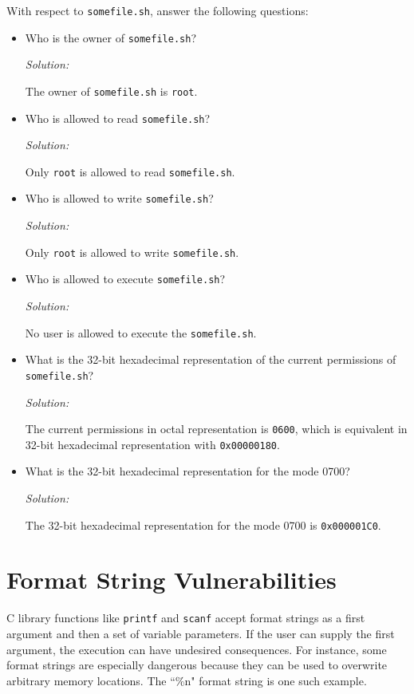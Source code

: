 \documentclass[a4paper,11pt]{article}
\newenvironment{solution}%
{\par{\noindent\small\textit{Solution:}}\vspace{-12pt}\begin{framed}}%
{\end{framed}\par}
\begin{document}
\noindent With respect to \texttt{somefile.sh}, answer the following questions:
\begin{itemize}
\item Who is the owner of \texttt{somefile.sh}?
\ifsolution\begin{solution}
The owner of \texttt{somefile.sh} is \texttt{root}.
\end{solution}\fi

\item Who is allowed to read \texttt{somefile.sh}?
\ifsolution\begin{solution}
Only \texttt{root} is allowed to read \texttt{somefile.sh}.
\end{solution}\fi
\item Who is allowed to write \texttt{somefile.sh}?
\ifsolution\begin{solution}
Only \texttt{root} is allowed to write \texttt{somefile.sh}.
\end{solution}\fi
\item Who is allowed to execute \texttt{somefile.sh}?
\ifsolution\begin{solution}
No user is allowed to execute the \texttt{somefile.sh}.
\end{solution}\fi
\item What is the 32-bit hexadecimal representation of the current permissions
  of \texttt{somefile.sh}?
\ifsolution\begin{solution}
The current permissions in octal representation is \texttt{0600}, which is equivalent in 32-bit hexadecimal representation with \texttt{0x00000180}. 
\end{solution}\fi
\item What is the 32-bit hexadecimal representation for the mode 0700? 
\ifsolution\begin{solution}
The 32-bit hexadecimal representation for the mode 0700 is \texttt{0x000001C0}.
\end{solution}\fi
\end{itemize}

\section*{Format String Vulnerabilities}

C library functions like \texttt{printf} and \texttt{scanf} accept format
strings as a first argument and then a set of variable parameters. If the user
can supply the first argument, the execution can have undesired consequences.
For instance, some format strings are especially dangerous because they can be
used to overwrite arbitrary memory locations. The ``\%n" format string is one
such example. 
\end{document}
